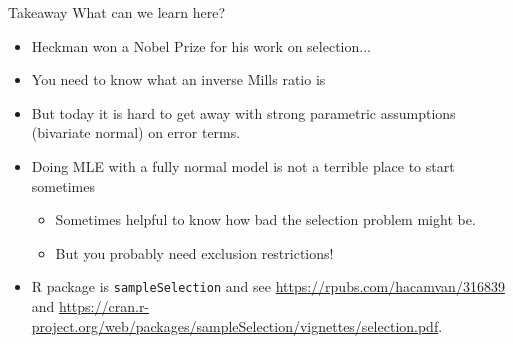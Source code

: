 \documentclass[aspectratio=169,11pt]{beamer}
\begin{document}
\begin{frame}{Takeaway}
What can we learn here?
\begin{itemize}
\item Heckman won a Nobel Prize for his work on selection...
\item You need to know what an \alert{inverse Mills ratio is}
\item But today it is hard to get away with strong parametric assumptions (bivariate normal) on error terms.
\item Doing MLE with a fully normal model is not a terrible place to start sometimes
\begin{itemize}
\item Sometimes helpful to know how bad the selection problem might be.
\item But you probably need \alert{exclusion restrictions}!
\end{itemize}
\item R package is \texttt{sampleSelection} and see \url{https://rpubs.com/hacamvan/316839} and \url{https://cran.r-project.org/web/packages/sampleSelection/vignettes/selection.pdf}.
\end{itemize}
\end{frame}
\end{document}
